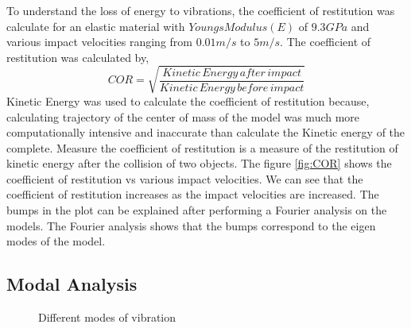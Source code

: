 To understand the loss of energy to vibrations, the coefficient of restitution was calculate for an elastic material with $Youngs Modulus(E)$ of $9.3GPa$ and various impact velocities ranging from $0.01m/s$ to $5m/s$.
The coefficient of restitution was calculated by,
\begin{equation}
COR = \sqrt{\frac{Kinetic\, Energy\, after\, impact}{Kinetic\, Energy\, before\, impact}}
\end{equation}
Kinetic Energy was used to calculate the coefficient of restitution because, calculating trajectory of the center of mass of the model was much more computationally intensive and inaccurate than calculate the Kinetic energy of the complete.
Measure the coefficient of restitution is a measure of the restitution of kinetic energy after the collision of two objects. The figure \ref{fig:COR} shows the coefficient of restitution vs various impact velocities. We can see that the coefficient of restitution increases as the impact velocities are increased. The bumps in the plot can be explained after performing a Fourier analysis on the models. The Fourier analysis shows that the bumps correspond to the eigen modes of the model.

\subsection{Modal Analysis}


\begin{figure}[H]
\centering
{}
\caption{Different modes of vibration}
\label{fig:modes}
\end{figure}

